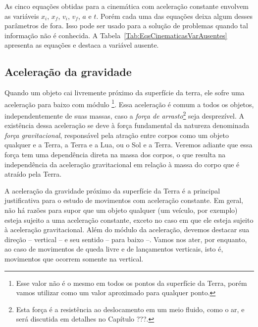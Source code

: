 As cinco equações obtidas para a cinemática com aceleração constante envolvem as variáveis $x_i$, $x_f$, $v_i$, $v_f$, $a$ e $t$. Porém cada uma das equações deixa algum desses parâmetros de fora. Isso pode ser usado para a solução de problemas quando tal informação não é conhecida. A Tabela~\ref{Tab:EqsCinematicasVarAusentes} apresenta as equações e destaca a variável ausente.

\subsection{Aceleração da gravidade}

Quando um objeto cai livremente próximo da superfície da terra, ele sofre uma aceleração para baixo com módulo \footnote{Esse valor não é o mesmo em todos os pontos da superfície da Terra, porém vamos utilizar  como um valor aproximado para qualquer ponto.}. Essa aceleração é comum a todos os objetos, independentemente de suas massas, caso a \emph{força de arrasto}\footnote{Esta força é a resistência ao deslocamento em um meio fluido, como o ar, e será discutida em detalhes no Capítulo ???.} seja desprezível. A existência dessa aceleração se deve à força fundamental da natureza denominada \emph{força gravitacional}, responsável pela atração entre corpos como um objeto qualquer e a Terra, a Terra e a Lua, ou o Sol e a Terra. Veremos adiante que essa força tem uma dependência direta na massa dos corpos, o que resulta na independência da aceleração gravitacional em relação à massa do corpo que é atraído pela Terra.

A aceleração da gravidade próximo da superfície da Terra é a principal justificativa para o estudo de movimentos com aceleração constante. Em geral, não há razões para supor que um objeto qualquer (um veículo, por exemplo) esteja sujeito a uma aceleração constante, exceto no caso em que ele esteja sujeito à aceleração gravitacional. Além do módulo da aceleração, devemos destacar sua direção -- vertical -- e seu sentido -- para baixo --. Vamos nos ater, por enquanto, ao caso de movimentos de queda livre e de lançamentos verticais, isto é, movimentos que ocorrem somente na vertical.
